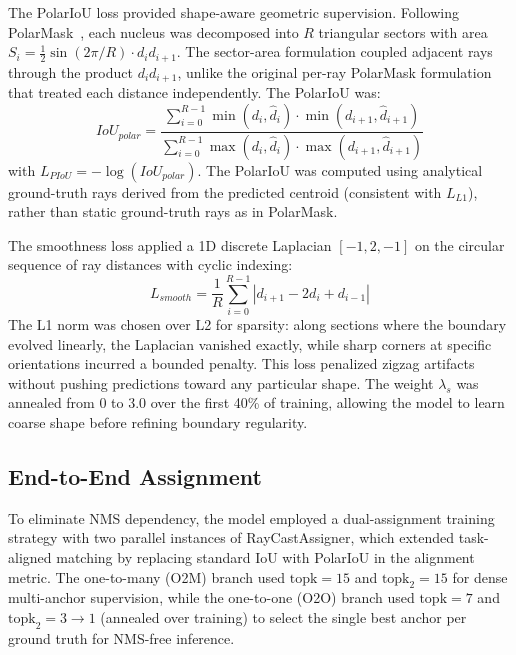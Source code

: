 \documentclass[conference]{IEEEtran}
\begin{document}
The PolarIoU loss provided shape-aware geometric supervision. Following PolarMask~\cite{xie2019polarmask}, each nucleus was decomposed into $R$ triangular sectors with area $S_i = \tfrac{1}{2} \sin(2\pi/R) \cdot d_i d_{i+1}$. The sector-area formulation coupled adjacent rays through the product $d_i d_{i+1}$, unlike the original per-ray PolarMask formulation that treated each distance independently. The PolarIoU was:
\begin{equation}
IoU_{polar} = \frac{\sum_{i=0}^{R-1} \min(d_i, \hat{d}_i) \cdot \min(d_{i+1}, \hat{d}_{i+1})}{\sum_{i=0}^{R-1} \max(d_i, \hat{d}_i) \cdot \max(d_{i+1}, \hat{d}_{i+1})}
\end{equation}
with $L_{PIoU} = -\log(IoU_{polar})$. The PolarIoU was computed using analytical ground-truth rays derived from the predicted centroid (consistent with $L_{L1}$), rather than static ground-truth rays as in PolarMask.

The smoothness loss applied a 1D discrete Laplacian $[-1, 2, -1]$ on the circular sequence of ray distances with cyclic indexing:
\begin{equation}
L_{smooth} = \frac{1}{R} \sum_{i=0}^{R-1} |d_{i+1} - 2d_i + d_{i-1}|
\end{equation}
The L1 norm was chosen over L2 for sparsity: along sections where the boundary evolved linearly, the Laplacian vanished exactly, while sharp corners at specific orientations incurred a bounded penalty. This loss penalized zigzag artifacts without pushing predictions toward any particular shape. The weight $\lambda_{s}$ was annealed from 0 to 3.0 over the first 40\% of training, allowing the model to learn coarse shape before refining boundary regularity.

\subsection{End-to-End Assignment}

To eliminate NMS dependency, the model employed a dual-assignment training strategy with two parallel instances of RayCastAssigner, which extended task-aligned matching by replacing standard IoU with PolarIoU in the alignment metric. The one-to-many (O2M) branch used $\text{topk}=15$ and $\text{topk}_2=15$ for dense multi-anchor supervision, while the one-to-one (O2O) branch used $\text{topk}=7$ and $\text{topk}_2=3\rightarrow 1$ (annealed over training) to select the single best anchor per ground truth for NMS-free inference.
\end{document}
